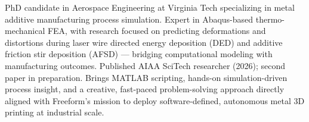 \documentclass[11pt,a4paper]{moderncv}
\begin{document}
\makecvtitle


\vspace{6pt}
\small{PhD candidate in Aerospace Engineering at Virginia Tech specializing in metal additive manufacturing process simulation. Expert in Abaqus-based thermo-mechanical FEA, with research focused on predicting deformations and distortions during laser wire directed energy deposition (DED) and additive friction stir deposition (AFSD) — bridging computational modeling with manufacturing outcomes. Published AIAA SciTech researcher (2026); second paper in preparation. Brings MATLAB scripting, hands-on simulation-driven process insight, and a creative, fast-paced problem-solving approach directly aligned with Freeform's mission to deploy software-defined, autonomous metal 3D printing at industrial scale.}

\end{document}
